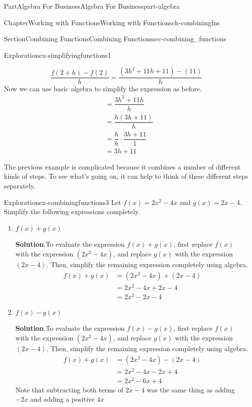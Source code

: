 \documentclass{tufte-book}
\newcommand{\blocktitlefont}{\relax}
\numberwithin{equation}{chapter}
\newcommand{\amp}{&}
\begin{document}
\begin{partptx}{Part}{Algebra For Business}{}{Algebra For Business}{}{}{part-algebra}
\begin{chapterptx}{Chapter}{Working with Functions}{}{Working with Functions}{}{}{ch-combiningfns}
\begin{sectionptx}{Section}{Combining Functions}{}{Combining Functions}{}{}{sec-combining_functions}
\begin{exploration}{Exploration}{}{ex-simplifyingfunctions1}
\begin{enumerate}[font=\bfseries,label=(\alph*),ref=\alph*]
\begin{equation*}
\dfrac{f(2+h)-f(2)}{h} = \dfrac{(3h^2+11h+11)-(11)}{h}
\end{equation*}
Now we can use basic algebra to simplify the expression as before.%
\begin{align*}
\amp = \dfrac{3h^2+11h}{h}\\
\amp = \dfrac{h(3h+11)}{h}\\
\amp = \dfrac{h}{h}\cdot \dfrac{3h+11}{1}\\
\amp = 3h+11
\end{align*}
%
\end{enumerate}%
\end{exploration}%
The previous example is complicated because it combines a number of different kinds of steps. To see what's going on, it can help to think of these different steps separately.%
\begin{exploration}{Exploration}{}{ex-combiningfunctions3}%
Let \(f(x) = 2x^2-4x\) and \(g(x)=2x-4\).  Simplify the following expressions completely.%
\begin{enumerate}[font=\bfseries,label=(\alph*),ref=\alph*]%
\item{}\(f(x)+g(x)\)%
\par\smallskip%
\noindent\textbf{\blocktitlefont Solution}.\hypertarget{ex-combiningfunctions3-2-2}{}\quad{}To evaluate the expression \(f(x)+g(x)\), first replace \(f(x)\) with the expression \((2x^2-4x)\), and replace \(g(x)\) with the expression \((2x-4)\).  Then, simplify the remaining expression completely using algebra.%
\begin{align*}
f(x)+g(x)\amp =(2x^2-4x) + (2x-4)\\
\amp = 2x^2-4x + 2x - 4\\
\amp = 2x^2 -2x -4 
\end{align*}
%
\item{}\(f(x)-g(x)\)%
\par\smallskip%
\noindent\textbf{\blocktitlefont Solution}.\hypertarget{ex-combiningfunctions3-3-2}{}\quad{}To evaluate the expression \(f(x)-g(x)\), first replace \(f(x)\) with the expression \((2x^2-4x)\), and replace \(g(x)\) with the expression \((2x-4)\).  Then, simplify the remaining expression completely using algebra.%
\begin{align*}
f(x)+g(x)\amp =(2x^2-4x) - (2x-4)\\
\amp = 2x^2-4x - 2x + 4\\
\amp = 2x^2 -6x + 4
\end{align*}
Note that subtracting both terms of \(2x-4\) was the same thing as adding \(-2x\) and adding a positive \(4x\)%

\end{enumerate}
\end{exploration}
\end{sectionptx}
\end{chapterptx}
\end{partptx}
\end{document}
